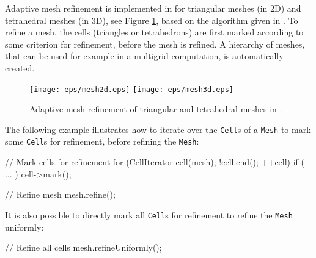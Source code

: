 Adaptive mesh refinement is implemented in \dolfin{} for triangular
meshes (in 2D) and tetrahedral meshes (in 3D), see Figure
\ref{fig:refinedmeshes}, based on the algorithm given in \cite{Bey95}.
To refine a mesh, the cells (triangles or tetrahedrons) are first
marked according to some criterion for refinement, before the mesh is
refined. A hierarchy of meshes, that can be used for example in a
multigrid computation, is automatically created.

\begin{figure}
  \begin{center}
    \texttt{[image: eps/mesh2d.eps]}
    \texttt{[image: eps/mesh3d.eps]}
    \caption{Adaptive mesh refinement of triangular and tetrahedral meshes in \dolfin{}.}
    \label{fig:refinedmeshes} 
  \end{center}
\end{figure}

The following example illustrates how to iterate over the \texttt{Cell}s of
a \texttt{Mesh} to mark some \texttt{Cell}s for refinement, before refining
the \texttt{Mesh}:
\begin{code}
  // Mark cells for refinement
  for (CellIterator cell(mesh); !cell.end(); ++cell)
    if ( ... )
      cell->mark();

  // Refine mesh
  mesh.refine();
\end{code}

It is also possible to directly mark all \texttt{Cell}s for refinement
to refine the \texttt{Mesh} uniformly:
\begin{code}
  // Refine all cells
  mesh.refineUniformly();
\end{code}
